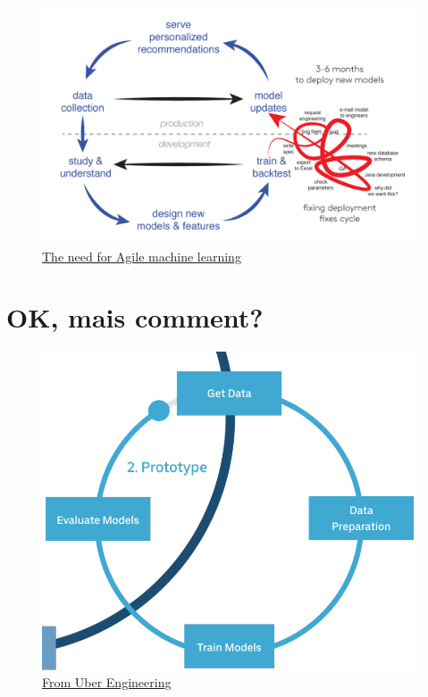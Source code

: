 \documentclass[aspectratio=169,10pt,xcolor=x11names,english,french]{beamer}
\begin{document}
	\begin{frame}
		\begin{figure}
			\centering
			\includegraphics[scale=0.24]{img/cycle-white.png}
			\caption{\href{https://johann.schleier-smith.com/blog/2015/08/09/need-for-agile-machine-learning.html}{The need for Agile machine learning}}
		\end{figure}
	\end{frame}
	
	\section{OK, mais comment?}
	
	\begin{frame}
		\begin{figure}
			\centering
			\includegraphics[scale=0.3]{img/cycle-2.png}
			\caption{\href{https://eng.uber.com/scaling-michelangelo/}{From Uber Engineering}}
		\end{figure}
	\end{frame}
\end{document}
